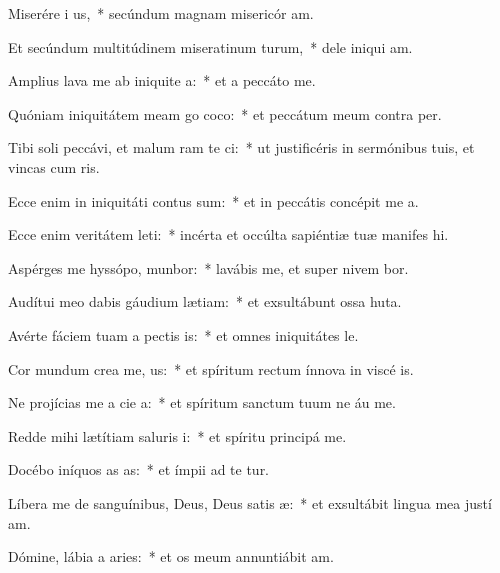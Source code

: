 \item Miserére i us,~* secúndum magnam misericór am.
\item Et secúndum multitúdinem miseratinum turum,~* dele iniqui am.
\item Amplius lava me ab iniquite a:~* et a peccáto   me.
\item Quóniam iniquitátem meam go coco:~* et peccátum meum contra   per.
\item Tibi soli peccávi, et malum ram te ci:~* ut justificéris in sermónibus tuis, et vincas cum ris.
\item Ecce enim in iniquitáti contus sum:~* et in peccátis concépit me  a.
\item Ecce enim veritátem leti:~* incérta et occúlta sapiéntiæ tuæ manifes hi.
\item Aspérges me hyssópo,  munbor:~* lavábis me, et super nivem bor.
\item Audítui meo dabis gáudium  lætiam:~* et exsultábunt ossa huta.
\item Avérte fáciem tuam a pectis is:~* et omnes iniquitátes  le.
\item Cor mundum crea  me, us:~* et spíritum rectum ínnova in viscé is.
\item Ne projícias me a cie a:~* et spíritum sanctum tuum ne áu  me.
\item Redde mihi lætítiam saluris i:~* et spíritu principá  me.
\item Docébo iníquos as as:~* et ímpii ad te tur.
\item Líbera me de sanguínibus, Deus, Deus satis æ:~* et exsultábit lingua mea justí am.
\item Dómine, lábia a aries:~* et os meum annuntiábit  am.
